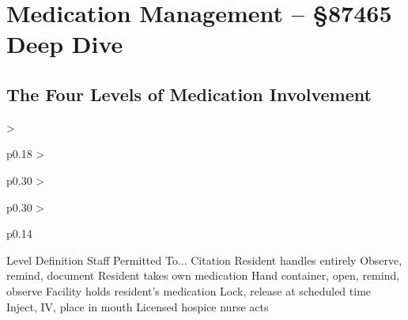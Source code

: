 \section{Medication Management -- §87465 Deep Dive}

\subsection{The Four Levels of Medication Involvement}
\begin{cheattablefour}
  {>{\raggedright\arraybackslash}p{0.18\linewidth}
   >{\raggedright\arraybackslash}p{0.30\linewidth}
   >{\raggedright\arraybackslash}p{0.30\linewidth}
   >{\raggedright\arraybackslash}p{0.14\linewidth}}
  {Level}
  {Definition}
  {Staff Permitted To...}
  {Citation}
     {Resident handles entirely}
     {Observe, remind, document}
     {}
     {Resident takes own medication}
     {Hand container, open, remind, observe}
     {}
     {Facility holds resident's medication}
     {Lock, release at scheduled time}
     {}
     {Inject, IV, place in mouth}
     {\medAdminProhibited}
     {}
     {Licensed hospice nurse acts}
     {\medHospiceWaiver}
     {}
\end{cheattablefour}

